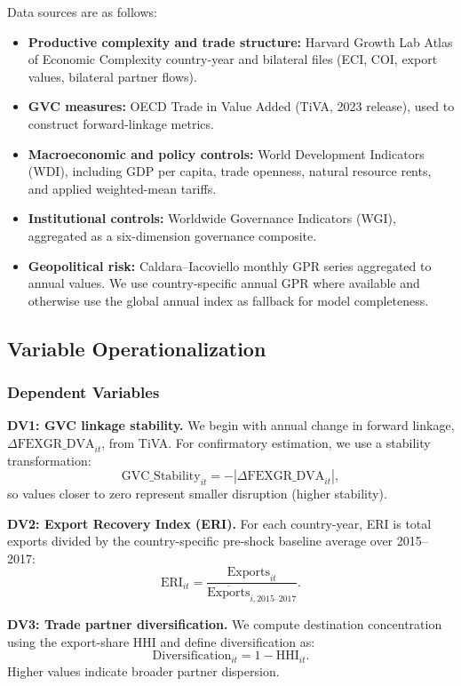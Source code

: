 Data sources are as follows:
\begin{itemize}
\item \textbf{Productive complexity and trade structure:} Harvard Growth Lab Atlas of Economic Complexity country-year and bilateral files (ECI, COI, export values, bilateral partner flows).
\item \textbf{GVC measures:} OECD Trade in Value Added (TiVA, 2023 release), used to construct forward-linkage metrics.
\item \textbf{Macroeconomic and policy controls:} World Development Indicators (WDI), including GDP per capita, trade openness, natural resource rents, and applied weighted-mean tariffs.
\item \textbf{Institutional controls:} Worldwide Governance Indicators (WGI), aggregated as a six-dimension governance composite.
\item \textbf{Geopolitical risk:} Caldara--Iacoviello monthly GPR series aggregated to annual values. We use country-specific annual GPR where available and otherwise use the global annual index as fallback for model completeness.
\end{itemize}

\subsection{Variable Operationalization}

\subsubsection{Dependent Variables}

\textbf{DV1: GVC linkage stability.} We begin with annual change in forward linkage, $\Delta \text{FEXGR\_DVA}_{it}$, from TiVA. For confirmatory estimation, we use a stability transformation:
\[
\text{GVC\_Stability}_{it} = -\left| \Delta \text{FEXGR\_DVA}_{it} \right|,
\]
so values closer to zero represent smaller disruption (higher stability).

\textbf{DV2: Export Recovery Index (ERI).} For each country-year, ERI is total exports divided by the country-specific pre-shock baseline average over 2015--2017:
\[
\text{ERI}_{it} = \frac{\text{Exports}_{it}}{\overline{\text{Exports}}_{i,2015\text{--}2017}}.
\]

\textbf{DV3: Trade partner diversification.} We compute destination concentration using the export-share HHI and define diversification as:
\[
\text{Diversification}_{it} = 1-\text{HHI}_{it}.
\]
Higher values indicate broader partner dispersion.

